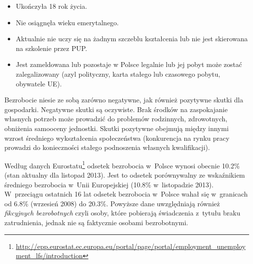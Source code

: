 \documentclass[12pt]{article}
\begin{document}
    \begin{itemize}
        \item Ukończyła 18 rok życia.
        \item Nie osiągnęła wieku emerytalnego.
        \item Aktualnie nie uczy się na żadnym szczeblu kształcenia lub nie jest skierowana na szkolenie przez PUP.
        \item Jest zameldowana lub pozostaje w Polsce legalnie lub jej pobyt może zostać zalegalizowany (azyl polityczny, karta stałego lub czasowego pobytu, obywatele UE).
    \end{itemize}
    
    Bezrobocie niesie ze sobą zarówno negatywne, jak również pozytywne skutki dla gospodarki. Negatywne skutki są oczywiste. Brak środków na zaspokajanie własnych potrzeb może prowadzić do problemów rodzinnych, zdrowotnych, obniżenia samooceny jednostki. Skutki pozytywne obejmują między innymi wzrost średniego wykształcenia społeczeństwa (konkurencja na rynku pracy prowadzi do konieczności stałego podnoszenia własnych kwalifikacji).
    
    Według danych Eurostatu\footnote{\url{http://epp.eurostat.ec.europa.eu/portal/page/portal/employment_unemployment_lfs/introduction}} odsetek bezrobocia w~Polsce wynosi obecnie 10.2\% (stan aktualny dla listopad 2013). Jest to odsetek porównywalny ze wskaźnikiem średniego bezrobocia w~Unii Europejskiej (10.8\% w~listopadzie 2013). W~przeciągu ostatnich 16 lat odsetek bezrobocia w~Polsce wahał się w~granicach od 6.8\% (wrzesień 2008) do 20.3\%. Powyższe dane uwzględniają również \emph{fikcyjnych bezrobotnych} czyli osoby, które pobierają świadczenia z~tytułu braku zatrudnienia, jednak nie są faktycznie osobami bezrobotnymi.
    
\end{document}
